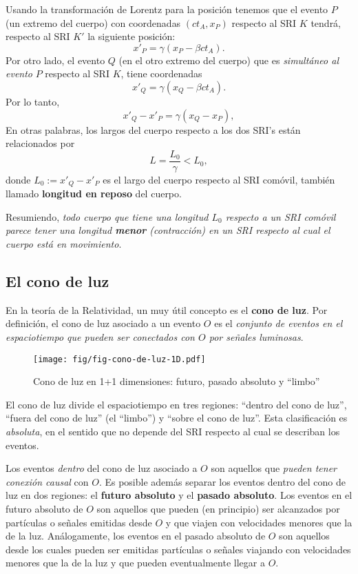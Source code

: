  Usando la transformación de Lorentz para la posición tenemos que el evento $P$ (un extremo del cuerpo) con coordenadas $(ct_A,x_P)$ respecto al SRI $K$ tendrá, respecto al SRI $K'$ la siguiente posición:
\begin{equation}
x'_P=\gamma(x_P-\beta c t_A).
\end{equation}
Por otro lado, el evento $Q$ (en el otro extremo del cuerpo) que es \textit{simultáneo al evento} $P$ respecto al SRI $K$, tiene coordenadas
\begin{equation}
x'_Q=\gamma(x_Q-\beta c t_A).
\end{equation}
Por lo tanto,
\begin{equation}
x'_Q-x'_P=\gamma(x_Q-x_P),
\end{equation}
En otras palabras, los largos del cuerpo respecto a los dos SRI's están relacionados por
\begin{equation}
L=\frac{L_0}{\gamma}<L_0,
\end{equation}
donde $L_0:=x'_Q-x'_P$ es el largo del cuerpo respecto al SRI comóvil, también llamado \textbf{longitud en reposo} del cuerpo.

Resumiendo, \textit{todo cuerpo que tiene una longitud $L_0$ respecto a un SRI comóvil parece tener una longitud \textbf{menor} (contracción) en un SRI respecto al cual el cuerpo está en movimiento}.

\subsection{El cono de luz}
En la teoría de la Relatividad, un muy útil concepto es el \textbf{cono de luz}. Por definición, el cono de luz asociado a un evento $O$ es el \textit{conjunto de eventos en el espaciotiempo que pueden ser conectados con $O$ por se\~nales luminosas}.
\begin{figure}[!h]
\centerline{\texttt{[image: fig/fig-cono-de-luz-1D.pdf]}}
 \caption{Cono de luz en 1+1 dimensiones: futuro, pasado absoluto y ``limbo''}
\label{lc}
\end{figure}
El cono de luz divide el espaciotiempo en tres regiones: ``dentro del cono de luz'', ``fuera del cono de luz'' (el ``limbo'') y ``sobre el cono de luz''. Esta clasificación es \textit{absoluta}, en el sentido que no depende del SRI respecto al cual se describan los eventos.

Los eventos \textit{dentro} del cono de luz asociado a $O$ son aquellos que \textit{pueden tener conexión causal} con $O$. Es posible además separar los eventos dentro del cono de luz en dos regiones: el \textbf{futuro absoluto} y el \textbf{pasado absoluto}. Los eventos en el futuro absoluto de $O$ son aquellos que pueden (en principio) ser alcanzados por partículas o se\~nales emitidas desde  $O$  y que viajen con velocidades menores que la de la luz. Análogamente, los eventos en el pasado absoluto de $O$ son aquellos desde los cuales pueden ser emitidas partículas o se\~nales viajando con velocidades menores que la de la luz y que pueden eventualmente llegar a $O$. 

